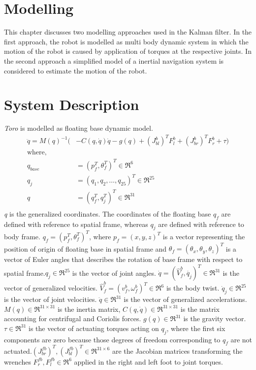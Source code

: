\documentclass[12pt]{article}
\begin{document}
\newpage
\section{Modelling}
This chapter discusses two modelling approaches used in the Kalman filter.
In the first approach, the robot is modelled as multi body dynamic system in which the motion of the robot is caused by application of torques at the respective joints.
In the second approach a simplified model of a inertial navigation system is considered to estimate the motion of the robot.
\section{System Description}
\emph{Toro} is modelled as floating base dynamic model.
\begin{equation}
	\label{eq:motion}
	\begin{split}
	\ddot{q} = M(q)^{-1}(&-C(q,\dot{q})\dot{q} - g(q) + (J_{bl}^{b})^{T}F_{l}^{b} +(J_{br}^{b})^{T}F_{r}^{b} + \tau) \\
	\text{where,}\\
	q_{base} &= (p_{f}^{T},\theta_{f}^{T})^{T} \in \Re^{6} \\
	q_{j} &= (q_{1},q_{2},\ldots , q_{25})^{T} \in \Re^{25}\\
	q &= (q_{f}^{T}, q_{j}^{T})^{T} \in \Re^{31}\\
	\end{split}
\end{equation}
\emph{q} is the generalized coordinates. The coordinates of the floating base $q_{f}$ are defined with reference to spatial frame, whereas $q_{j}$ are defined with reference to body frame. $q_{f} = (p_{f}^{T},\theta_{f}^{T})^{T}$, where $p_{f}=(x,y,z)^{T}$ is a vector representing  the position of origin of floating base in spatial frame and $\theta_{f}=(\theta_{x},\theta_{y},\theta_{z})^{T}$ is a vector of Euler angles that describes the rotation of base frame with respect to spatial frame.$q_{j} \in \Re^{25}$ is the vector of joint angles. $\dot{q} =  (\hat{V}_{f}^{b},\dot{q_{j}})^{T} \in \Re^{31}$ is the vector of generalized velocities. $\hat{V}_{f}^{b} = (v_f^b,\omega_f^b)^T \in \Re^{6}$ is the body twist. $\dot{q}_{j} \in \Re^{25}$ is the vector of joint velocities. $\ddot{q}\in \Re^{31}$ is the vector of generalized accelerations. $M(q)\in \Re^{31 \times 31}$ is the inertia matrix, $C(q,\dot{q})\in \Re^{31 \times 31}$ is the matrix accounting for centrifugal and Coriolis forces. $g(q) \in \Re^{31}$ is the gravity vector. $\tau \in \Re^{31}$ is the vector of actuating torques acting on $q_{j}$, where the first six components are zero because those degrees of freedom corresponding to $q_{f}$ are not actuated.$(J_{br}^{fb})^{T},(J_{bl}^{fb})^{T} \in \Re^{31 \times 6}$ are the Jacobian matrices transforming the wrenches $F_{r}^{fb},F_{l}^{fb} \in \Re^{6}$ applied in the right and left foot to joint torques.
\end{document}
